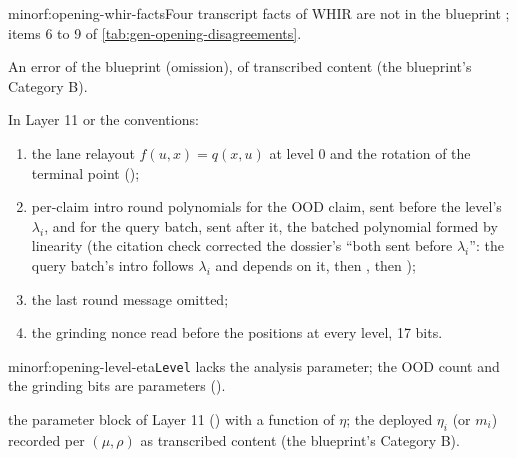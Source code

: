 \begin{finding}{minor}{f:opening-whir-facts}{Four transcript facts of WHIR are not in the blueprint}
 ; items 6 to 9 of \cref{tab:gen-opening-disagreements}.

 An error of the blueprint (omission), of transcribed content (the blueprint's
Category B).

 In Layer 11 or the conventions:
\begin{enumerate}[label=(\alph*)]
\item the lane relayout $f(u, x) = q(x, u)$ at level 0 and the rotation of the terminal point
  ();
\item per-claim intro round polynomials for the OOD claim, sent before the level's $λ_i$, and for
  the query batch, sent after it, the batched polynomial formed by linearity (the citation check
  corrected the dossier's ``both sent before $λ_i$'': the query batch's intro follows $λ_i$ and
  depends on it,  then ,  then );
\item the last round message omitted;
\item the grinding nonce read before the positions at every level, 17 bits.
\end{enumerate}
\end{finding}

\begin{finding}{minor}{f:opening-level-eta}{\texttt{Level} lacks the analysis parameter; the OOD count and the grinding bits are parameters}
  ().

\begin{change}{the parameter block of Layer 11 ()}
\asproposed {}
with  a function of $η$; the deployed $η_i$ (or $m_i$) recorded per $(μ, ρ)$ as
transcribed content (the blueprint's Category B).
\end{change}
\end{finding}

